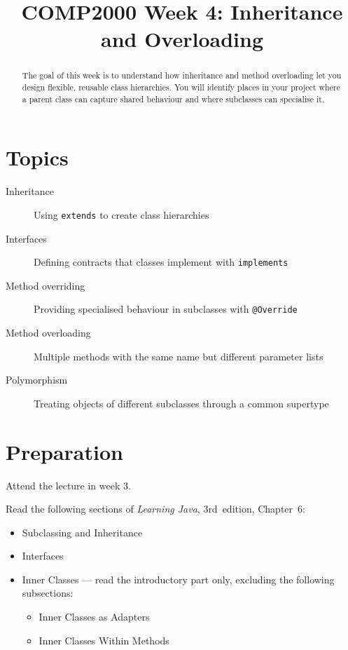 \documentclass[twoside=false,DIV=14]{scrartcl}
\title{\color{redish} \vspace{-1em}COMP2000 Week 4: Inheritance and Overloading}
\begin{document}
{\color{blackish}\maketitle}\vspace{-7em}

\begin{abstract}
The goal of this week is to understand how inheritance and method overloading let you design flexible, reusable class hierarchies.  You will identify places in your project where a parent class can capture shared behaviour and where subclasses can specialise it.
\end{abstract}

\section*{Topics}
\begin{description}
\item[Inheritance] Using \texttt{extends} to create class hierarchies
\item[Interfaces] Defining contracts that classes implement with \texttt{implements}
\item[Method overriding] Providing specialised behaviour in subclasses with \texttt{@Override}
\item[Method overloading] Multiple methods with the same name but different parameter lists
\item[Polymorphism] Treating objects of different subclasses through a common supertype
\end{description}

\section*{Preparation}
Attend the lecture in week 3.

Read the following sections of \textit{Learning Java}, 3rd~edition, Chapter~6:
\begin{itemize}
    \item Subclassing and Inheritance
    \item Interfaces
    \item Inner Classes --- read the introductory part only, excluding the following subsections:
    \begin{itemize}
        \item Inner Classes as Adapters
        \item Inner Classes Within Methods
    \end{itemize}
\end{itemize}
\end{document}
